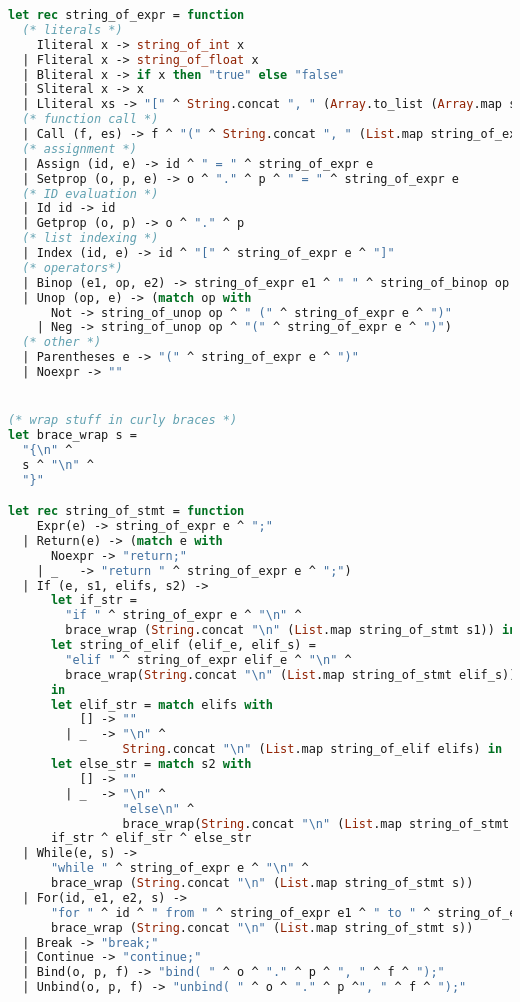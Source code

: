 \begin{lstlisting}[language=Caml,backgroundcolor=\color{backgroundcolor}]
let rec string_of_expr = function
  (* literals *)
    Iliteral x -> string_of_int x
  | Fliteral x -> string_of_float x
  | Bliteral x -> if x then "true" else "false"
  | Sliteral x -> x
  | Lliteral xs -> "[" ^ String.concat ", " (Array.to_list (Array.map string_of_expr xs)) ^ "]"
  (* function call *)
  | Call (f, es) -> f ^ "(" ^ String.concat ", " (List.map string_of_expr es) ^ ")"
  (* assignment *)
  | Assign (id, e) -> id ^ " = " ^ string_of_expr e
  | Setprop (o, p, e) -> o ^ "." ^ p ^ " = " ^ string_of_expr e
  (* ID evaluation *)
  | Id id -> id
  | Getprop (o, p) -> o ^ "." ^ p
  (* list indexing *)
  | Index (id, e) -> id ^ "[" ^ string_of_expr e ^ "]"
  (* operators*)
  | Binop (e1, op, e2) -> string_of_expr e1 ^ " " ^ string_of_binop op ^ " " ^ string_of_expr e2
  | Unop (op, e) -> (match op with
      Not -> string_of_unop op ^ " (" ^ string_of_expr e ^ ")"
    | Neg -> string_of_unop op ^ "(" ^ string_of_expr e ^ ")")
  (* other *)
  | Parentheses e -> "(" ^ string_of_expr e ^ ")"
  | Noexpr -> ""


(* wrap stuff in curly braces *)
let brace_wrap s =
  "{\n" ^
  s ^ "\n" ^
  "}"

let rec string_of_stmt = function
    Expr(e) -> string_of_expr e ^ ";"
  | Return(e) -> (match e with
      Noexpr -> "return;"
    | _   -> "return " ^ string_of_expr e ^ ";")
  | If (e, s1, elifs, s2) ->
      let if_str =
        "if " ^ string_of_expr e ^ "\n" ^
        brace_wrap (String.concat "\n" (List.map string_of_stmt s1)) in
      let string_of_elif (elif_e, elif_s) = 
        "elif " ^ string_of_expr elif_e ^ "\n" ^
        brace_wrap(String.concat "\n" (List.map string_of_stmt elif_s))
      in
      let elif_str = match elifs with 
          [] -> ""
        | _  -> "\n" ^
                String.concat "\n" (List.map string_of_elif elifs) in
      let else_str = match s2 with
          [] -> ""
        | _  -> "\n" ^
                "else\n" ^
                brace_wrap(String.concat "\n" (List.map string_of_stmt s2)) in
      if_str ^ elif_str ^ else_str
  | While(e, s) ->
      "while " ^ string_of_expr e ^ "\n" ^
      brace_wrap (String.concat "\n" (List.map string_of_stmt s))
  | For(id, e1, e2, s) ->
      "for " ^ id ^ " from " ^ string_of_expr e1 ^ " to " ^ string_of_expr e2 ^ "\n" ^
      brace_wrap (String.concat "\n" (List.map string_of_stmt s))
  | Break -> "break;"
  | Continue -> "continue;"
  | Bind(o, p, f) -> "bind( " ^ o ^ "." ^ p ^ ", " ^ f ^ ");"
  | Unbind(o, p, f) -> "unbind( " ^ o ^ "." ^ p ^", " ^ f ^ ");"


\end{lstlisting}
